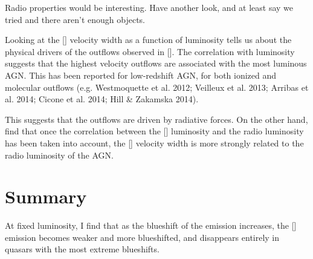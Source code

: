 Radio properties would be interesting. 
Have another look, and at least say we tried and there aren't enough objects.


Looking at the [] velocity width as a function of luminosity tells us about the physical drivers of the outflows observed in []. 
The correlation with luminosity suggests that the highest velocity outflows are associated with the most luminous AGN. 
This has been reported for low-redshift AGN, for both ionized and molecular outflows (e.g. Westmoquette et al. 2012; Veilleux et al. 2013; Arribas et al. 2014; Cicone et al. 2014; Hill \& Zakamska 2014).

This suggests that the outflows are driven by radiative forces. 
On the other hand, \citet{mullaney13} find that once the correlation between the [] luminosity and the radio luminosity has been taken into account, the [] velocity width is more strongly related to the radio luminosity of the AGN. 

\section{Summary}

At fixed luminosity, I find that as the blueshift of the  emission increases, the [] emission becomes weaker and more blueshifted, and disappears entirely in quasars with the most extreme  blueshifts.  